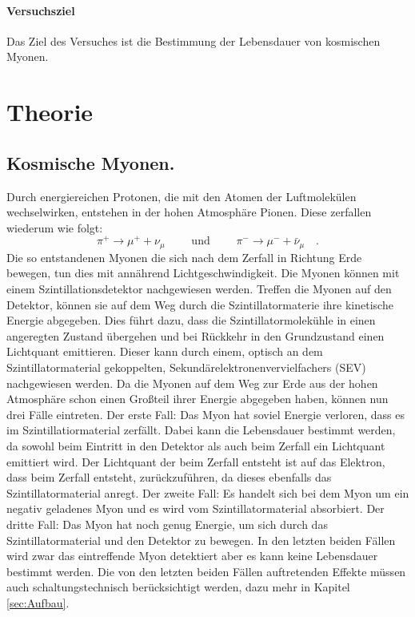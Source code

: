 \paragraph{Versuchsziel}
Das Ziel des Versuches ist die Bestimmung der Lebensdauer von kosmischen Myonen.

\section{Theorie}
\label{sec:Theorie}

\subsection{Kosmische Myonen.}
Durch energiereichen Protonen, die mit den Atomen der Luftmolekülen wechselwirken, entstehen in der hohen 
Atmosphäre Pionen. Diese zerfallen wiederum wie folgt:
\begin{equation*} 
\pi^+ \to \mu^+ + \nu_{\mu} \qquad \text{ und } \qquad \pi^- \to \mu^- + \bar{\nu}_{\mu} \quad .
\end{equation*}
Die so entstandenen Myonen die sich nach dem Zerfall in Richtung Erde bewegen, tun dies mit annährend 
Lichtgeschwindigkeit. Die Myonen können mit einem Szintillationsdetektor nachgewiesen werden. 
Treffen die Myonen auf den Detektor, können sie auf dem  Weg durch die Szintillatormaterie ihre kinetische 
Energie abgegeben. Dies führt dazu, dass die Szintillatormolekühle in einen angeregten Zustand übergehen und bei 
Rückkehr in den Grundzustand einen Lichtquant emittieren. Dieser kann durch einem, optisch an dem 
Szintillatormaterial gekoppelten, Sekundärelektronenvervielfachers (SEV) nachgewiesen werden. Da die Myonen auf dem
Weg zur Erde aus der hohen Atmosphäre schon einen Großteil ihrer Energie abgegeben haben, können nun drei Fälle 
eintreten. Der erste Fall: Das Myon hat soviel Energie verloren, dass es im Szintillatiormaterial zerfällt. Dabei 
kann die Lebensdauer bestimmt werden, da sowohl beim Eintritt in den Detektor als auch beim Zerfall ein Lichtquant 
emittiert wird. Der Lichtquant der beim Zerfall entsteht ist auf das Elektron, dass beim Zerfall entsteht, 
zurückzuführen, da dieses ebenfalls das Szintillatormaterial anregt. Der zweite Fall: Es handelt sich bei dem 
Myon um ein negativ geladenes Myon und es wird vom Szintillatormaterial absorbiert. Der dritte Fall: Das 
Myon hat noch genug Energie, um sich durch das 
Szintillatormaterial und den Detektor zu bewegen. In den letzten beiden Fällen wird zwar das eintreffende Myon 
detektiert aber es kann keine Lebensdauer bestimmt werden. Die von den letzten beiden Fällen auftretenden 
Effekte müssen auch schaltungstechnisch berücksichtigt werden, dazu mehr in Kapitel \ref{sec:Aufbau}.
